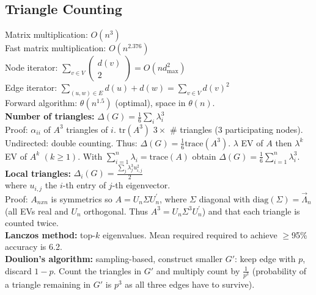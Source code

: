 \subsection*{Triangle Counting}
Matrix multiplication: $O(n^3)$\\
Fast matrix multiplication: $O(n^{2.376})$\\
Node iterator: $\sum_{v \in V} \begin{pmatrix} d(v) \\ 2 \end{pmatrix} = O(nd_{\text{max}}^2)$\\
Edge iterator: $\sum_{(u,w) \in E} d(u) + d(w) = \sum_{v \in V} d(v)^2$\\
Forward algorithm: $\theta(n^{1.5})$ (optimal), space in $\theta(n)$.\\
\textbf{Number of triangles:} $\Delta(G) = \frac{1}{6} \sum_i \lambda_i^3$\\
Proof: $\alpha_{ii}$ of $A^3$ triangles of $i$. $\text{tr}(A^3)$ $3\times$ \# triangles (3 participating nodes). Undirected: double counting. Thus: $\Delta(G) = \frac{1}{6} \text{trace}(A^3)$. $\lambda$ EV of $A$ then $\lambda^k$ EV of $A^k$ $(k \geq 1)$. With $\sum_{i=1}^n \lambda_i = \text{trace}(A)$ obtain $\Delta(G) = \frac{1}{6} \sum_{i=1}^n \lambda_i^3$.\\
\textbf{Local triangles:} $\Delta_i(G) = \frac{\sum_j \lambda_j^3 u_{i,j}^2}{2}$\\
where $u_{i,j}$ the $i$-th entry of $j$-th eigenvector.\\
Proof: $A_{nxn}$ is symmetrics so $A = U_n \Sigma U_n^{'}$, where $\Sigma$ diagonal with $\text{diag}(\Sigma) = \vec{\Lambda}_n$ (all EVs real and $U_n$ orthogonal. Thus $A^3 = U_n \Sigma^3 U_n^{'}$) and that each triangle is counted twice.\\
\textbf{Lanczos method:} top-$k$ eigenvalues. Mean required required to achieve $\geq$95\% accuracy is 6.2.\\
\textbf{Doulion's algorithm:} sampling-based, construct smaller $G'$: keep edge with $p$, discard $1-p$. Count the triangles in $G'$ and multiply count by $\frac{1}{p^3}$ (probability of a triangle remaining in $G'$ is $p^3$ as all three edges have to survive).